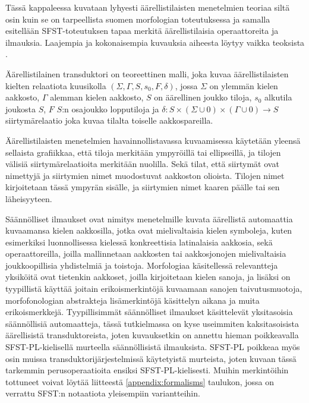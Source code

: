 \documentclass[free]{flammie}
\begin{document}
Tässä kappaleessa kuvataan lyhyesti äärellistilaisten menetelmien teoriaa siltä
osin kuin se on tarpeellista suomen morfologian toteutuksessa ja samalla esitellään SFST-toteutuksen tapaa merkitä äärellistilaisia operaattoreita ja ilmauksia.
Laajempia ja kokonaisempia kuvauksia aiheesta löytyy vaikka teoksista
\cite{aho2007compiler,beesley2004finite}.

Äärellistilainen transduktori on teoreettinen malli, joka kuvaa äärellistilaisten
kielten relaatiota kuusikolla
$(\Sigma, \Gamma, S, s_0 , F, \delta)$, jossa $\Sigma$ on ylemmän kielen
aakkosto, $\Gamma$ alemman
kielen aakkosto, $S$ on äärellinen joukko tiloja, $s_0$ alkutila joukosta
$S$, $F$ $S$:n osajoukko lopputiloja ja $\delta : S × (\Sigma ∪ 0) × (\Gamma ∪ 0) → S$ siirtymärelaatio
joka kuvaa tilalta toiselle aakkospareilla. \cite{jurafsky2000speech}

Äärellistilaisten menetelmien havainnollistavassa kuvaamisessa käytetään yleensä
sellaista grafiikkaa, että tiloja merkitään ympyröillä tai ellipseillä, ja tilojen välisiä
siirtymärelaatioita merkitään nuolilla. Sekä tilat, että siirtymät ovat nimettyjä ja
siirtymien nimet muodostuvat aakkoston olioista. Tilojen nimet kirjoitetaan tässä
ympyrän sisälle, ja siirtymien nimet kaaren päälle tai sen läheisyyteen.

Säännölliset ilmaukset ovat nimitys menetelmille kuvata äärellistä automaattia
kuvaamansa kielen aakkosilla, jotka ovat mielivaltaisia kielen symboleja, kuten
esimerkiksi luonnollisessa kielessä konkreettisia latinalaisia aakkosia, sekä operaattoreilla, joilla mallinnetaan aakkosten tai aakkosjonojen mielivaltaisia joukkoopillisia yhdistelmiä ja toistoja. Morfologiaa käsitellessä relevantteja yksiköitä
ovat tietenkin aakkoset, joilla kirjoitetaan kielen sanoja, ja lisäksi on tyypillistä
käyttää joitain erikoismerkintöjä kuvaamaan sanojen taivutusmuotoja, morfofonologian abstrakteja lisämerkintöjä käsittelyn aikana ja muita erikoismerkkejä. Tyypillisimmät säännölliset ilmaukset käsittelevät yksitasoisia säännöllisiä automaatteja, tässä tutkielmassa on kyse useimmiten kaksitasoisista äärellisistä transduktoreista, joten kuvauksetkin on annettu hieman poikkeavalla SFST-PL-kielisellä
murteella säännöllisistä ilmauksista. SFST-PL poikkeaa myös osin muissa
transduktorijärjestelmissä käytetyistä murteista, joten kuvaan tässä tarkemmin
perusoperaatioita ensiksi SFST-PL-kielisesti. Muihin merkintöihin tottuneet
voivat löytää liitteestä \ref{appendix:formalisms} taulukon, jossa on verrattu SFST:n notaatiota yleisempiin variantteihin.
\end{document}
